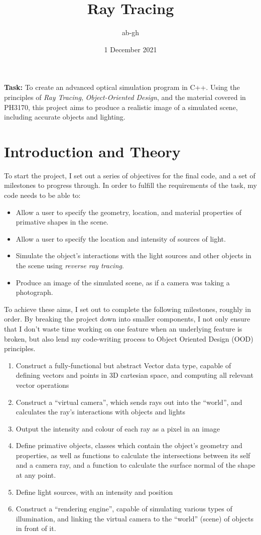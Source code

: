 \documentclass[a4paper]{article}
\title{Ray Tracing}
\author{ab-gh}
\date{1 December 2021}
\begin{document}
\maketitle

{\bf Task:} To create an advanced optical simulation program in C++. Using the principles of {\it Ray Tracing}, {\it Object-Oriented Design}, and the material covered in PH3170, this project aims to produce a realistic image of a simulated scene, including accurate objects and lighting.

\section{Introduction and Theory}
To start the project, I set out a series of objectives for the final code, and a set of milestones to progress through. In order to fulfill the requirements of the task, my code needs to be able to:
\begin{itemize}
  \item{Allow a user to specify the geometry, location, and material properties of primative shapes in the scene.}
  \item{Allow a user to specify the location and intensity of sources of light.}
  \item{Simulate the object's interactions with the light sources and other objects in the scene using {\it reverse ray tracing}.}
  \item{Produce an image of the simulated scene, as if a camera was taking a photograph.}
\end{itemize}
To achieve these aims, I set out to complete the following milestones, roughly in order. By breaking the project down into smaller components, I not only ensure that I don't waste time working on one feature when an underlying feature is broken, but also lend my code-writing process to Object Oriented Design (OOD) principles.
\begin{enumerate}
  \item{Construct a fully-functional but abstract Vector data type, capable of defining vectors and points in 3D cartesian space, and computing all relevant vector operations}
  \item{Construct a ``virtual camera'', which sends rays out into the ``world'', and calculates the ray's interactions with objects and lights}
  \item{Output the intensity and colour of each ray as a pixel in an image}
  \item{Define primative objects, classes which contain the object's geometry and properties, as well as functions to calculate the intersections between its self and a camera ray, and a function to calculate the surface normal of the shape at any point.}
  \item{Define light sources, with an intensity and position}
  \item{Construct a ``rendering engine'', capable of simulating various types of illumination, and linking the virtual camera to the ``world'' (scene) of objects in front of it.}
\end{enumerate}
\end{document}
